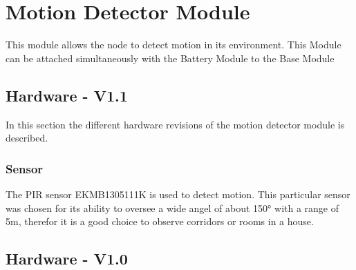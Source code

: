 \section{Motion Detector Module} 
This module allows the node to detect motion in its environment. This Module can be 
attached simultaneously with the Battery Module to the Base Module
\subsection {Hardware - V1.1}
In this section the different hardware revisions of the motion detector module is 
described. 

\subsubsection{Sensor}
The PIR sensor EKMB1305111K is used to detect motion. This particular sensor was chosen
for its ability to oversee a wide angel of about 150° with a range of 5m, therefor it is
a good choice to observe corridors or rooms in a house.

\subsection {Hardware - V1.0}